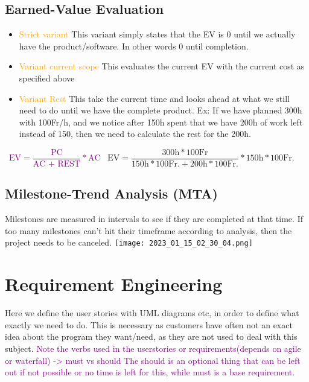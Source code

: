 \documentclass[main.tex,fontsize=12pt,paper=a4,paper=landscape,DIV=calc,]{scrartcl}
\begin{document}
\begin{multicols*}{2}
\subsection{Earned-Value Evaluation}
\begin{itemize}
\item \textcolor{orange}{Strict variant}\newline
  This variant simply states that the EV is 0 until we actually have the product/software.\newline
  In other words 0 until completion.
\item \textcolor{orange}{Variant current scope}\newline
  This evaluates the current EV with the current cost as specified above
\item \textcolor{orange}{Variant Rest}\newline
  This take the current time and looks ahead at what we still need to do until we have the complete product.\newline
  Ex: If we have planned 300h with 100Fr/h, and we notice after 150h spent that we have 200h of work left instead of 150, then we need to calculate the rest for the 200h.\newline
\end{itemize} 
\, \newline
\large \textcolor{purple}{\(\text{EV} = \dfrac{\text{PC}}{\text{AC + REST}} * \text{AC}\)}\newline
\normalsize \, \newline
\(\text{EV} = \dfrac{300\text{h} * 100\text{Fr}}{150\text{h} * 100\text{Fr.} + 200\text{h} * 100\text{Fr.}} * 150\text{h} * 100\text{Fr.} \)

\subsection{Milestone-Trend Analysis (MTA)} 
Milestones are measured in intervals to see if they are completed at that time.\newline
If too many milestones can't hit their timeframe according to analysis, then the project needs to be canceled.\newline 
\texttt{[image: 2023\_01\_15\_02\_30\_04.png]}

\section{Requirement Engineering} 
Here we define the user stories with UML diagrams etc, in order to define what exactly we need to do.\newline
This is necessary as customers have often not an exact idea about the program they want/need, as they are not used to deal with this subject.\newline
\textcolor{purple}{Note the verbs used in the userstories or requirements(depends on agile or waterfall) -> must vs should\newline
The should is an optional thing that can be left out if not possible or no time is left for this, while must is a base requirement.} 


\end{multicols*}
\end{document}
